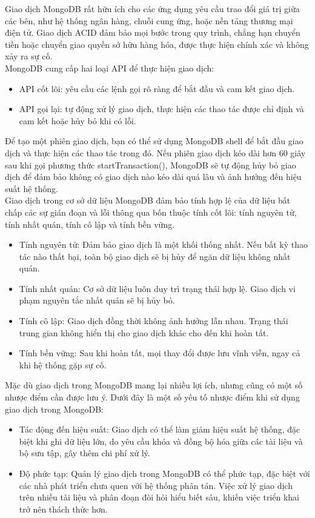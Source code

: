Giao dịch MongoDB rất hữu ích cho các ứng dụng yêu cầu trao đổi giá trị giữa các bên, như hệ thống ngân hàng, chuỗi cung ứng, hoặc nền tảng thương mại điện tử. Giao dịch ACID đảm bảo mọi bước trong quy trình, chẳng hạn chuyển tiền hoặc chuyển giao quyền sở hữu hàng hóa, được thực hiện chính xác và không xảy ra sự cố.\\

MongoDB cung cấp hai loại API để thực hiện giao dịch:
\begin{itemize}
    \item API cốt lõi: yêu cầu các lệnh gọi rõ ràng để bắt đầu và cam kết giao dịch.
    \item API gọi lại: tự động xử lý giao dịch, thực hiện các thao tác được chỉ định và cam kết hoặc hủy bỏ khi có lỗi.
\end{itemize}

Để tạo một phiên giao dịch, bạn có thể sử dụng MongoDB shell để bắt đầu giao dịch và thực hiện các thao tác trong đó. Nếu phiên giao dịch kéo dài hơn 60 giây sau khi gọi phương thức startTransaction(), MongoDB sẽ tự động hủy bỏ giao dịch để đảm bảo không có giao dịch nào kéo dài quá lâu và ảnh hưởng đến hiệu suất hệ thống.\\


Giao dịch trong cơ sở dữ liệu MongoDB đảm bảo tính hợp lệ của dữ liệu bất chấp các sự gián đoạn và lỗi thông qua bốn thuộc tính cốt lõi: tính nguyên tử, tính nhất quán, tính cô lập và tính bền vững.
\begin{itemize}
    \item Tính nguyên tử: Đảm bảo giao dịch là một khối thống nhất. Nếu bất kỳ thao tác nào thất bại, toàn bộ giao dịch sẽ bị hủy để ngăn dữ liệu không nhất quán.
    \item Tính nhất quán: Cơ sở dữ liệu luôn duy trì trạng thái hợp lệ. Giao dịch vi phạm nguyên tắc nhất quán sẽ bị hủy bỏ.
    \item Tính cô lập: Giao dịch đồng thời không ảnh hưởng lẫn nhau. Trạng thái trung gian không hiển thị cho giao dịch khác cho đến khi hoàn tất.
    \item Tính bền vững: Sau khi hoàn tất, mọi thay đổi được lưu vĩnh viễn, ngay cả khi hệ thống gặp sự cố.
\end{itemize}

Mặc dù giao dịch trong MongoDB mang lại nhiều lợi ích, nhưng cũng có một số nhược điểm cần được lưu ý. Dưới đây là một số yếu tố nhược điểm khi sử dụng giao dịch trong MongoDB:
\begin{itemize}
    \item Tác động đến hiệu suất: Giao dịch có thể làm giảm hiệu suất hệ thống, đặc biệt khi ghi dữ liệu lớn, do yêu cầu khóa và đồng bộ hóa giữa các tài liệu và bộ sưu tập, gây thêm chi phí xử lý.
    \item Độ phức tạp: Quản lý giao dịch trong MongoDB có thể phức tạp, đặc biệt với các nhà phát triển chưa quen với hệ thống phân tán. Việc xử lý giao dịch trên nhiều tài liệu và phân đoạn đòi hỏi hiểu biết sâu, khiến việc triển khai trở nên thách thức hơn.
\end{itemize}

